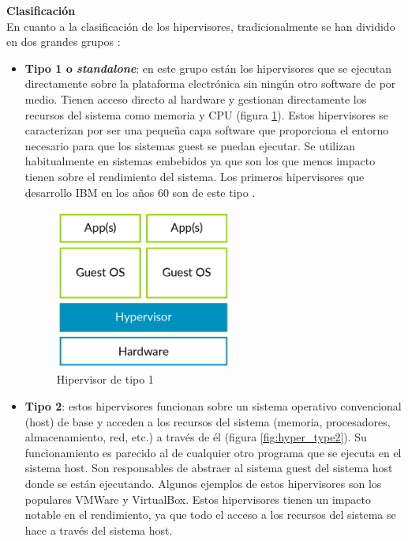 \textbf{Clasificación}\\
En cuanto a la clasificación de los hipervisores, tradicionalmente se han dividido en dos grandes grupos \cite{Popek1974} \cite{hyper_review}:
\begin{itemize}
\item \textbf{Tipo 1 o \textit{standalone}}: en este grupo están los hipervisores que se ejecutan directamente sobre
la plataforma electrónica sin ningún otro software de por medio. Tienen acceso directo al hardware y gestionan directamente los recursos del sistema como memoria y CPU (figura \ref{fig:hyper_type1}). Estos hipervisores se caracterizan por ser una pequeña capa software que proporciona el entorno necesario para que los sistemas guest se puedan ejecutar. Se utilizan habitualmente en sistemas embebidos ya que son los que menos impacto tienen sobre el rendimiento del sistema. Los primeros hipervisores que desarrollo IBM en los años 60 son de este tipo \cite{hyper_review}.\\
\begin{figure}[!h]
	\centering
	\includegraphics[width=0.55\textwidth]{recursos/type1_hyp.png}
	\caption{Hipervisor de tipo 1}
	\label{fig:hyper_type1}
\end{figure}

\item \textbf{Tipo 2}: estos hipervisores funcionan sobre un sistema operativo convencional (host) de base y
acceden a los recursos del sistema (memoria, procesadores, almacenamiento, red, etc.) a
través de él (figura \ref{fig:hyper_type2}). Su funcionamiento es parecido al de cualquier otro programa que se ejecuta en el sistema host. Son responsables de abstraer al sistema guest del sistema host donde se están ejecutando. Algunos ejemplos de estos hipervisores son los populares VMWare y VirtualBox. Estos hipervisores tienen un impacto notable en el rendimiento, ya que todo el acceso a los recursos del sistema se hace a través del sistema host.\\


\end{itemize}
